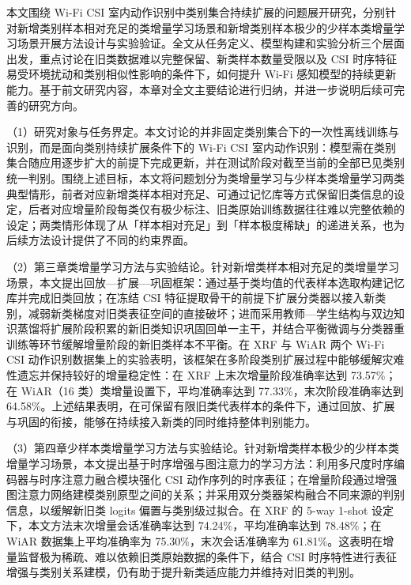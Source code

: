 

本文围绕 Wi-Fi CSI 室内动作识别中类别集合持续扩展的问题展开研究，分别针对新增类别样本相对充足的类增量学习场景和新增类别样本极少的少样本类增量学习场景开展方法设计与实验验证。全文从任务定义、模型构建和实验分析三个层面出发，重点讨论在旧类数据难以完整保留、新类样本数量受限以及 CSI 时序特征易受环境扰动和类别相似性影响的条件下，如何提升 Wi-Fi 感知模型的持续更新能力。基于前文研究内容，本章对全文主要结论进行归纳，并进一步说明后续可完善的研究方向。


（1）研究对象与任务界定。本文讨论的并非固定类别集合下的一次性离线训练与识别，而是面向类别持续扩展条件下的 Wi-Fi CSI 室内动作识别：模型需在类别集合随应用逐步扩大的前提下完成更新，并在测试阶段对截至当前的全部已见类别统一判别。围绕上述目标，本文将问题划分为类增量学习与少样本类增量学习两类典型情形，前者对应新增类样本相对充足、可通过记忆库等方式保留旧类信息的设定，后者对应增量阶段每类仅有极少标注、旧类原始训练数据往往难以完整依赖的设定；两类情形体现了从「样本相对充足」到「样本极度稀缺」的递进关系，也为后续方法设计提供了不同的约束界面。

（2）第三章类增量学习方法与实验结论。针对新增类样本相对充足的类增量学习场景，本文提出回放—扩展—巩固框架：通过基于类均值的代表样本选取构建记忆库并完成旧类回放；在冻结 CSI 特征提取骨干的前提下扩展分类器以接入新类别，减弱新类梯度对旧类表征空间的直接破坏；进而采用教师—学生结构与双边知识蒸馏将扩展阶段积累的新旧类知识巩固回单一主干，并结合平衡微调与分类器重训练等环节缓解增量阶段的新旧类样本不平衡。在 XRF 与 WiAR 两个 Wi-Fi CSI 动作识别数据集上的实验表明，该框架在多阶段类别扩展过程中能够缓解灾难性遗忘并保持较好的增量稳定性：在 XRF 上末次增量阶段准确率达到 73.57\%；在 WiAR（16 类）类增量设置下，平均准确率达到 77.33\%，末次阶段准确率达到 64.58\%。上述结果表明，在可保留有限旧类代表样本的条件下，通过回放、扩展与巩固的衔接，能够在持续接入新类的同时维持整体判别能力。

（3）第四章少样本类增量学习方法与实验结论。针对新增类样本极少的少样本类增量学习场景，本文提出基于时序增强与图注意力的学习方法：利用多尺度时序编码器与时序注意力融合模块强化 CSI 动作序列的时序表征；在增量阶段通过增强图注意力网络建模类别原型之间的关系；并采用双分类器架构融合不同来源的判别信息，以缓解新旧类 logits 偏置与类别级过拟合。在 XRF 的 5-way 1-shot 设定下，本文方法末次增量会话准确率达到 74.24\%，平均准确率达到 78.48\%；在 WiAR 数据集上平均准确率为 75.30\%，末次会话准确率为 61.81\%。这表明在增量监督极为稀疏、难以依赖旧类原始数据的条件下，结合 CSI 时序特性进行表征增强与类别关系建模，仍有助于提升新类适应能力并维持对旧类的判别。

